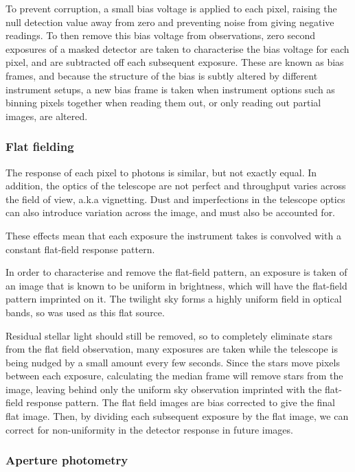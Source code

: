 To prevent corruption, a small bias voltage is applied to each pixel, raising the null detection value away from zero and preventing noise from giving negative readings.
To then remove this bias voltage from observations, zero second exposures of a masked detector are taken to characterise the bias voltage for each pixel, and are subtracted off each subsequent exposure. These are known as bias frames, and because the structure of the bias is subtly altered by different instrument setups, a new bias frame is taken when instrument options such as binning pixels together when reading them out, or only reading out partial images, are altered.


\subsubsection{Flat fielding}
\label{sect:observations:flat field frames}

The response of each pixel to photons is similar, but not exactly equal. In addition, the optics of the telescope are not perfect and throughput varies across the field of view, a.k.a vignetting.
Dust and imperfections in the telescope optics can also introduce variation across the image, and must also be accounted for.

These effects mean that each exposure the instrument takes is convolved with a constant flat-field response pattern.

In order to characterise and remove the flat-field pattern, an exposure is taken of an image that is known to be uniform in brightness, which will have the flat-field pattern imprinted on it.
The twilight sky forms a highly uniform field in optical bands, so was used as this flat source.

Residual stellar light should still be removed, so to completely eliminate stars from the flat field observation, many exposures are taken while the telescope is being nudged by a small amount every few seconds. Since the stars move pixels between each exposure, calculating the median frame will remove stars from the image, leaving behind only the uniform sky observation imprinted with the flat-field response pattern.
The flat field images are bias corrected to give the final flat image.
Then, by dividing each subsequent exposure by the flat image, we can correct for non-uniformity in the detector response in future images.


\subsubsection{Aperture photometry}
\label{sect:observations:aperture photometry}

